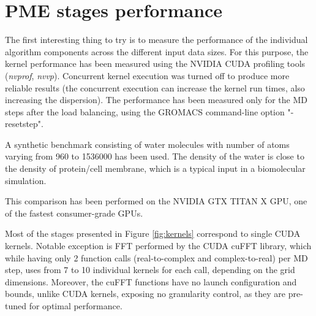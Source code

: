\documentclass[12pt,a4paper,notitlepage]{report}
\begin{document}

\section{PME stages performance} \label{chapter_kernels}

The first interesting thing to try is to measure the performance of the individual algorithm components across the different input data sizes.
For this purpose, the kernel performance has been measured using the NVIDIA CUDA profiling tools (\textit{nvprof}, \textit{nvvp}). Concurrent kernel execution was turned off to produce more reliable results (the concurrent execution can increase the kernel run times, also increasing the  dispersion). The performance has been measured only for the MD steps after the load balancing, using the GROMACS command-line option "-resetstep". 

A synthetic benchmark consisting of water molecules with number of atoms varying from 960 to 1536000 has been used. The density of the water is close to the density of protein/cell membrane, which is a typical input in a biomolecular simulation.

This comparison has been performed on the NVIDIA GTX TITAN X GPU, one of the fastest consumer-grade GPUs.

Most of the stages presented in Figure \ref{fig:kernels} correspond to single CUDA kernels. Notable exception is FFT performed by the CUDA cuFFT library, which while having only 2 function calls (real-to-complex and complex-to-real) per MD step, uses from 7 to 10 individual kernels for each call, depending on the grid dimensions. Moreover, the cuFFT functions have no launch configuration and bounds, unlike CUDA kernels, exposing no granularity control, as they are pre-tuned for optimal performance. 

\end{document}

